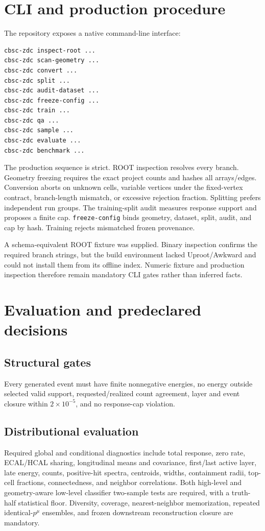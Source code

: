 \documentclass[10pt,a4paper]{article}
\newcommand{\pFour}{p^{\mu}}
\begin{document}
\section{CLI and production procedure}

The repository exposes a native command-line interface:
\begin{lstlisting}
cbsc-zdc inspect-root ...
cbsc-zdc scan-geometry ...
cbsc-zdc convert ...
cbsc-zdc split ...
cbsc-zdc audit-dataset ...
cbsc-zdc freeze-config ...
cbsc-zdc train ...
cbsc-zdc qa ...
cbsc-zdc sample ...
cbsc-zdc evaluate ...
cbsc-zdc benchmark ...
\end{lstlisting}

The production sequence is strict. ROOT inspection resolves every branch. Geometry freezing requires the exact project counts and hashes all arrays/edges. Conversion aborts on unknown cells, variable vertices under the fixed-vertex contract, branch-length mismatch, or excessive rejection fraction. Splitting prefers independent run groups. The training-split audit measures response support and proposes a finite cap. \texttt{freeze-config} binds geometry, dataset, split, audit, and cap by hash. Training rejects mismatched frozen provenance.

A schema-equivalent ROOT fixture was supplied. Binary inspection confirms the required branch strings, but the build environment lacked Uproot/Awkward and could not install them from its offline index. Numeric fixture and production inspection therefore remain mandatory CLI gates rather than inferred facts.

\section{Evaluation and predeclared decisions}

\subsection{Structural gates}
Every generated event must have finite nonnegative energies, no energy outside selected valid support, requested/realized count agreement, layer and event closure within $2\times10^{-5}$, and no response-cap violation.

\subsection{Distributional evaluation}
Required global and conditional diagnostics include total response, zero rate, ECAL/HCAL sharing, longitudinal means and covariance, first/last active layer, late energy, counts, positive-hit spectra, centroids, widths, containment radii, top-cell fractions, connectedness, and neighbor correlations. Both high-level and geometry-aware low-level classifier two-sample tests are required, with a truth-half statistical floor. Diversity, coverage, nearest-neighbor memorization, repeated identical-$\pFour$ ensembles, and frozen downstream reconstruction closure are mandatory.
\end{document}
